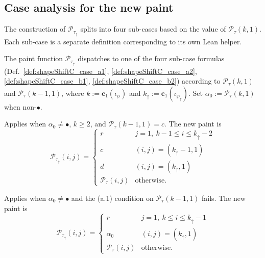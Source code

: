 \subsection{Case analysis for the new paint}

The construction of $\mathcal{P}_{\tau_\uparrow}$ splits into four sub-cases
based on the value of $\mathcal{P}_\tau(k, 1)$. Each sub-case is a separate
definition corresponding to its own Lean helper.

\begin{definition}
  \label{def:shapeShiftC_paint}
  \leanok
  The paint function $\mathcal{P}_{\tau_\uparrow}$ dispatches to one of the
  four sub-case formulas
  (Def.~\ref{def:shapeShiftC_case_a1},
  \ref{def:shapeShiftC_case_a2},
  \ref{def:shapeShiftC_case_b1},
  \ref{def:shapeShiftC_case_b2})
  according to $\mathcal{P}_\tau(k, 1)$ and $\mathcal{P}_\tau(k - 1, 1)$,
  where $k := \mathbf{c}_1(\iota_\wp)$ and $k_\uparrow := \mathbf{c}_1(\iota_{\wp_\uparrow})$.
  Set $\alpha_0 := \mathcal{P}_\tau(k, 1)$ when non-$\bullet$.
\end{definition}

\begin{definition}
  \label{def:shapeShiftC_case_a1}
  \leanok
  Applies when $\alpha_0 \neq \bullet$, $k \geq 2$, and $\mathcal{P}_\tau(k - 1, 1) = c$.
  The new paint is
  \[
    \mathcal{P}_{\tau_\uparrow}(i, j) =
    \begin{cases}
      r & j = 1,\ k - 1 \leq i \leq k_\uparrow - 2 \\
      c & (i, j) = (k_\uparrow - 1, 1) \\
      d & (i, j) = (k_\uparrow, 1) \\
      \mathcal{P}_\tau(i, j) & \text{otherwise.}
    \end{cases}
  \]
  \end{definition}

\smallskip

\begin{definition}
  \label{def:shapeShiftC_case_a2}
  \leanok
  Applies when $\alpha_0 \neq \bullet$ and the (a.1) condition on $\mathcal{P}_\tau(k - 1, 1)$ fails.
  The new paint is
  \[
    \mathcal{P}_{\tau_\uparrow}(i, j) =
    \begin{cases}
      r & j = 1,\ k \leq i \leq k_\uparrow - 1 \\
      \alpha_0 & (i, j) = (k_\uparrow, 1) \\
      \mathcal{P}_\tau(i, j) & \text{otherwise.}
    \end{cases}
  \]
  \end{definition}

